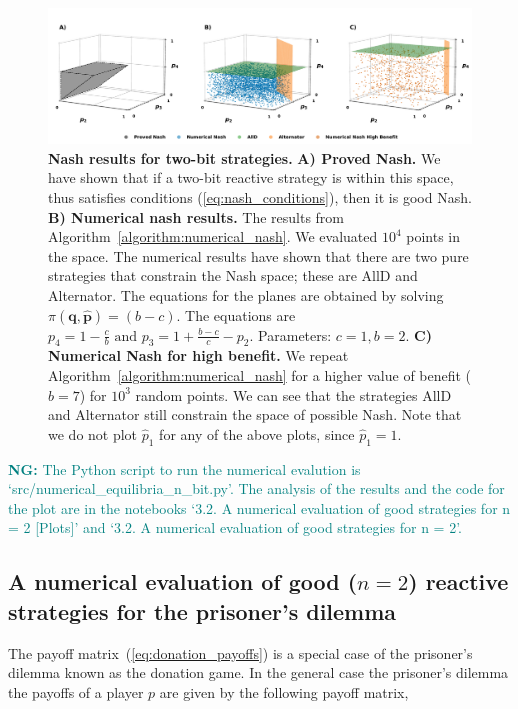 \documentclass{article}
\theoremstyle{definition}
\newcommand{\nikoleta}[1]{\textcolor{teal}{{\bf NG:} #1}}
\begin{document}
\begin{figure}[!htbp]
     \centering
     \includegraphics[width=\textwidth]{static/two_bit_reactive_numerical_results.pdf}
     \caption{\textbf{Nash results for two-bit strategies.}
     \textbf{A) Proved Nash.} We have shown that if a two-bit reactive
     strategy is within this space, thus satisfies conditions
     (\ref{eq:nash_conditions}), then it is good Nash. \textbf{B) Numerical nash
     results.} The results from
     Algorithm~\ref{algorithm:numerical_nash}. We evaluated \(10 ^ 4\) points in
     the space. The numerical results have shown that there are two pure
     strategies that constrain the Nash space; these are AllD and Alternator.
     The equations for the planes are obtained by solving
     \(\pi(\mathbf{q}, \mathbf{\hat{p}}) = (b\!-\!c)\). The equations are
     \(p_4 = 1 - \frac{c}{b} \text{ and }  p_3 = 1 + \frac{b\!-\!c}{c} - p_2\).
      Parameters: \(c=1, b=2\). \textbf{C) Numerical Nash for high benefit.} We repeat
     Algorithm~\ref{algorithm:numerical_nash} for a higher value of benefit
     (\(b=7\)) for \(10 ^ 3\) random points. We can see that the strategies AllD
     and Alternator still constrain the space of possible Nash. Note that we do
     not plot \(\hat{p}_1\) for any of the above plots, since \(\hat{p}_1=1\).}\label{fig:two_bit_reactive_nash_results}
\end{figure}

\nikoleta{The Python script to run the numerical evalution is
`src/numerical\_equilibria\_n\_bit.py'. The analysis of the results and the code
for the plot are in the notebooks `3.2. A numerical evaluation of good
strategies for n = 2 [Plots]' and `3.2. A numerical evaluation of good
strategies for n = 2'.}

\subsection{A numerical evaluation of good (\(n=2\)) reactive strategies for the prisoner's dilemma}\label{section:good_strategies_numerically_pd}

The payoff matrix~(\ref{eq:donation_payoffs}) is a special case of the
prisoner's dilemma known as the donation game. In the general case the
prisoner's dilemma the payoffs of a player \(p\) are given by the following
payoff matrix,
\end{document}
